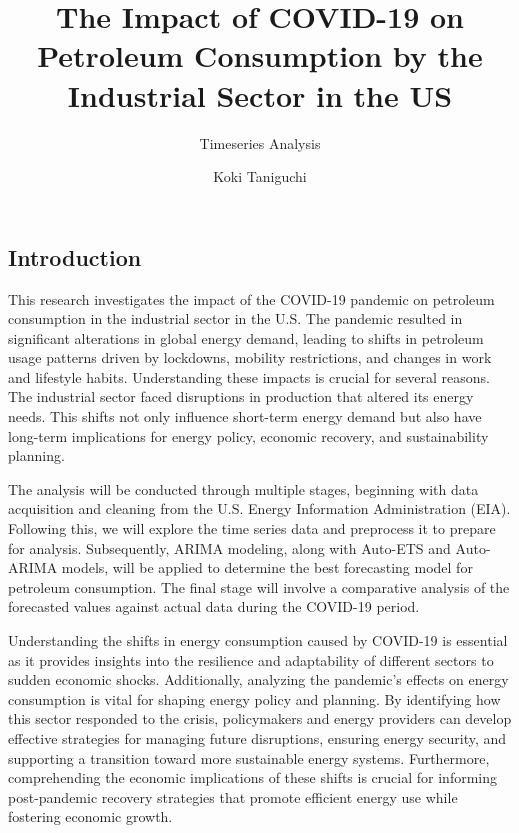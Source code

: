 \documentclass[
  letterpaper,
  DIV=11,
  numbers=noendperiod]{scrartcl}
\title{The Impact of COVID-19 on Petroleum Consumption by the Industrial
Sector in the US}
\subtitle{Timeseries Analysis}
\author{Koki Taniguchi}
\date{}
\renewcommand*\contentsname{Table of contents}
\newcommand\contentsname{Table of contents}
\begin{document}
\maketitle

\renewcommand*\contentsname{Table of contents}
{
\hypersetup{linkcolor=}
\setcounter{tocdepth}{2}
\tableofcontents
}

\subsection{Introduction}\label{introduction}

This research investigates the impact of the COVID-19 pandemic on
petroleum consumption in the industrial sector in the U.S. The pandemic
resulted in significant alterations in global energy demand, leading to
shifts in petroleum usage patterns driven by lockdowns, mobility
restrictions, and changes in work and lifestyle habits. Understanding
these impacts is crucial for several reasons. The industrial sector
faced disruptions in production that altered its energy needs. This
shifts not only influence short-term energy demand but also have
long-term implications for energy policy, economic recovery, and
sustainability planning.

The analysis will be conducted through multiple stages, beginning with
data acquisition and cleaning from the U.S. Energy Information
Administration (EIA). Following this, we will explore the time series
data and preprocess it to prepare for analysis. Subsequently, ARIMA
modeling, along with Auto-ETS and Auto-ARIMA models, will be applied to
determine the best forecasting model for petroleum consumption. The
final stage will involve a comparative analysis of the forecasted values
against actual data during the COVID-19 period.

Understanding the shifts in energy consumption caused by COVID-19 is
essential as it provides insights into the resilience and adaptability
of different sectors to sudden economic shocks. Additionally, analyzing
the pandemic's effects on energy consumption is vital for shaping energy
policy and planning. By identifying how this sector responded to the
crisis, policymakers and energy providers can develop effective
strategies for managing future disruptions, ensuring energy security,
and supporting a transition toward more sustainable energy systems.
Furthermore, comprehending the economic implications of these shifts is
crucial for informing post-pandemic recovery strategies that promote
efficient energy use while fostering economic growth.
\end{document}
